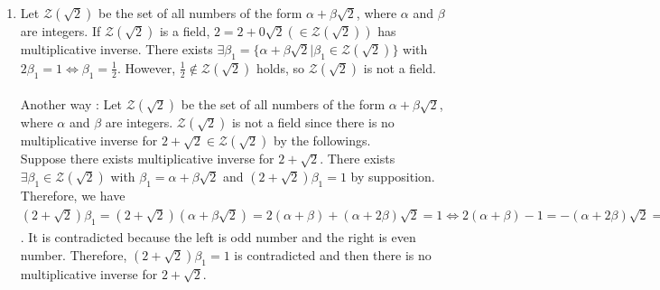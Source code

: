 \documentclass{article}
\newcommand\Z{\mathcal Z}
\newcommand\Q{\mathcal Q}
\begin{document}
\begin{enumerate}[label = (\alph*)]
\begin{enumerate}[label=\arabic*)]
($\Q(\sqrt2)$ has multiplicative identity)
\item For all $\alpha_1 \in \Q(\sqrt2)$ with $\alpha_1 \ne 0$, put $\alpha_1 = a + b\sqrt2$ with $a,b \in \Q$. In this case, $a \ne 0$ or $b \ne 0$ holds by the followings.\\
``If $\alpha_1 = 0$, we have $\alpha_1 = a + b\sqrt2 = 0 \Leftrightarrow a = -b\sqrt2$. 
Therefore, $a = b = 0$ by $a,b \in \Q$.''\\
Let $\alpha''_1 = \dfrac{a}{a^2 - 2b^2} + \left(-\dfrac{b}{a^2 - 2b^2}\right)\sqrt2 \in \Q(\sqrt2)$. Note that we have $a^2 -2b^2 = (a + b\sqrt2)(a - b\sqrt2)$ and $a,b \in \Q$ with ($a \ne 0$ or $b \ne 0$), so we have $a + b\sqrt2 \ne 0$ and $a - b\sqrt2 \ne 0$, and then $a^2 -2b^2 \in \Q$ with $a^2 -2b^2 \ne 0$.
We have $\alpha_1\alpha''_1 = (a + b\sqrt2)\left(\dfrac{a}{a^2 - 2b^2} + \left(-\dfrac{b}{a^2 - 2b^2}\right)\sqrt2\right) = \dfrac{a^2 - ab\sqrt2 + ab\sqrt2 - 2b^2 }{a^2 - 2b^2} = 1$. 
Therefore, to every $\alpha_1 \in \Q(\sqrt2)$ with $\alpha_1 \ne 0$, there exists $\alpha''_1 \in \Q(\sqrt2)$ with $\alpha_1\alpha''_1 = 1$
\item $\alpha_1(\alpha_2 + \alpha_3) = \alpha_1\alpha_2 + \alpha_1\alpha_3$ (distributive law stands)
\end{enumerate}
from 1) to )9, $\Q(\sqrt2)$ is a field.
\item
Let $\Z(\sqrt2)$ be the set of all numbers of the form $\alpha + \beta\sqrt2$, where $\alpha$ and $\beta$ are integers. If $\Z(\sqrt2)$ is a field, $2 = 2 + 0\sqrt2 (\in \Z(\sqrt2))$ has multiplicative inverse. There exists $\exists\beta_1 = \{\alpha + \beta\sqrt2 |\beta_1 \in \Z(\sqrt2)\}$ with $2\beta_1 = 1 \iff \beta_1 = \frac{1}{2}$. However, $\frac{1}{2} \not\in \Z(\sqrt2)$ holds, so $\Z(\sqrt2)$ is not a field.\\\\
Another way : Let $\Z(\sqrt2)$ be the set of all numbers of the form $\alpha + \beta\sqrt2$, where $\alpha$ and $\beta$ are integers. 
$\Z(\sqrt2)$ is not a field since there is no multiplicative inverse for $2 + \sqrt2 \in \Z(\sqrt2)$ by the followings.\\
Suppose there exists multiplicative inverse for $2 + \sqrt2$.
There exists $\exists\beta_1 \in \Z(\sqrt2)$ with $\beta_1 = \alpha + \beta\sqrt2$ and $(2 + \sqrt2)\beta_1 = 1$ by supposition.
Therefore, we have $(2 + \sqrt2)\beta_1 = (2 + \sqrt2)(\alpha + \beta\sqrt2) = 2(\alpha + \beta) + (\alpha + 2\beta)\sqrt2 = 1 \iff 2(\alpha + \beta) - 1 = -(\alpha + 2\beta)\sqrt2 \implies 2(2(\alpha + \beta)^2 - 2(\alpha + \beta)) - 1 = 2(\alpha + 2\beta)^2$.
It is contradicted because the left is odd number and the right is even number.
Therefore, $(2 + \sqrt2)\beta_1 = 1$ is contradicted and then there is no multiplicative inverse for $2 + \sqrt2$.
\end{enumerate}
\end{document}
